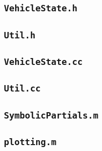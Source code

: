 \documentclass[11pt]{article}
\begin{document}
\subsection{\texttt{VehicleState.h}}


\subsection{\texttt{Util.h}}


\subsection{\texttt{VehicleState.cc}}


\subsection{\texttt{Util.cc}}



\subsection{\texttt{SymbolicPartials.m}}


\subsection{\texttt{plotting.m}}

\end{document}
